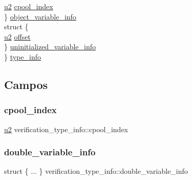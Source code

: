 \begin{DoxyCompactItemize}
\begin{tabbing}
\>\>\hyperlink{lista__operandos_8h_a732cde1300aafb73b0ea6c2558a7a54f}{u2} \hyperlink{structverification__type__info_a5be06fb276eacd06d97febe64d7be884}{cpool\_index}\\
\>\} \hyperlink{structverification__type__info_a7c237ceba51b307a76bbacaa30702e90}{object\_variable\_info}\\
\>struct \{\\
\>\>\hyperlink{lista__operandos_8h_a732cde1300aafb73b0ea6c2558a7a54f}{u2} \hyperlink{structverification__type__info_a697499159761ac261e39a9f7aabfb27d}{offset}\\
\>\} \hyperlink{structverification__type__info_add124f08b7f592406443d601651970d9}{uninitialized\_variable\_info}\\
\} \hyperlink{structverification__type__info_ab47e1887d0e10211164b9d0a16d79565}{type\_info}\\

\end{tabbing}\end{DoxyCompactItemize}


\subsection{Campos}
\mbox{\label{structverification__type__info_a5be06fb276eacd06d97febe64d7be884}} 
\subsubsection{\texorpdfstring{cpool\+\_\+index}{cpool\_index}}
{\footnotesize\ttfamily \hyperlink{lista__operandos_8h_a732cde1300aafb73b0ea6c2558a7a54f}{u2} verification\+\_\+type\+\_\+info\+::cpool\+\_\+index}

\mbox{\label{structverification__type__info_ae2e04072010fa85856e99f2e5b723c1e}} 
\subsubsection{\texorpdfstring{double\+\_\+variable\+\_\+info}{double\_variable\_info}}
{\footnotesize\ttfamily struct \{ ... \}   verification\+\_\+type\+\_\+info\+::double\+\_\+variable\+\_\+info}

